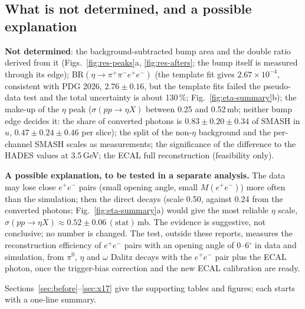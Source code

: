 \documentclass[11pt,a4paper]{article}
\newcommand{\piz}{\ensuremath{\pi^{0}}\xspace}
\newcommand{\ee}{\ensuremath{e^{+}e^{-}}\xspace}
\newcommand{\ppee}{\ensuremath{\pi^{+}\pi^{-}e^{+}e^{-}}\xspace}
\newcommand{\Mee}{\ensuremath{M(e^{+}e^{-})}\xspace}
\newcommand{\sigeta}{\ensuremath{\sigma(pp\to\eta X)}\xspace}
\begin{document}
\subsection{What is not determined, and a possible explanation}
\label{sec:notdet}
\textbf{Not determined}: the background-subtracted bump area and the double ratio derived from it (Figs.~\ref{fig:res-peaks}a, \ref{fig:res-afters};
the bump itself is measured through its edge); BR$(\eta\to\ppee)$ (the template fit gives $2.67\times10^{-4}$, consistent with PDG 2026,
$2.76\pm0.16$, but the template fits failed the pseudo-data test and the total uncertainty is about 130\,\%; Fig.~\ref{fig:eta-summary}b); the make-up of the
$\eta$ peak (\sigeta between 0.25 and 0.52\,mb; neither bump edge decides it: the share of converted photons is $0.83\pm0.20\pm0.34$ of SMASH in $u$,
$0.47\pm0.24\pm0.46$ per slice); the split of the non-$\eta$ background and the per-channel SMASH scales as measurements; the significance of the
difference to the HADES values at 3.5\,GeV; the ECAL full reconstruction (feasibility only).

\textbf{A possible explanation, to be tested in a separate analysis.} The data may lose close \ee pairs (small opening angle, small \Mee) more
often than the simulation; then the direct decays (scale 0.50, against 0.24 from the converted photons; Fig.~\ref{fig:eta-summary}a) would give the most
reliable $\eta$ scale, \sigeta $\approx0.52\pm0.06\,(\mathrm{stat})$\,mb. The evidence is suggestive, not conclusive; no number is changed. The test,
outside these reports, measures the reconstruction efficiency of \ee pairs with an opening angle of 0--6$^\circ$ in data and simulation, from \piz,
$\eta$ and $\omega$ Dalitz decays with the \ee pair plus the ECAL photon, once the trigger-bias correction and the new ECAL calibration are ready.

\bigskip
{}\par
\smallskip
\noindent Sections~\ref{sec:before}--\ref{sec:x17} give the supporting tables and figures; each starts with a one-line summary.

\end{document}
